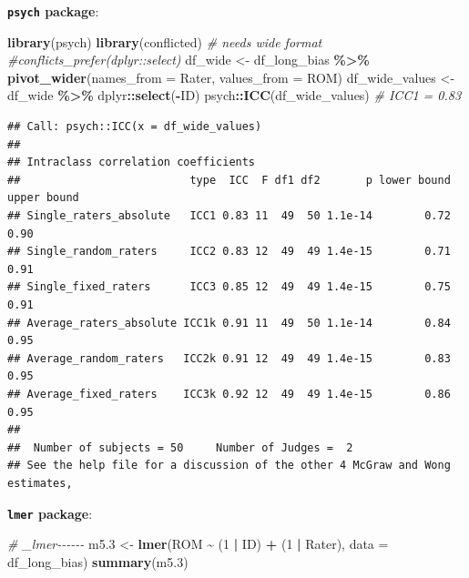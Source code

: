 \documentclass[
]{book}
\newenvironment{Shaded}{\begin{snugshade}}{\end{snugshade}}
\newcommand{\AttributeTok}[1]{\textcolor[rgb]{0.13,0.29,0.53}{#1}}
\newcommand{\CommentTok}[1]{\textcolor[rgb]{0.56,0.35,0.01}{\textit{#1}}}
\newcommand{\DecValTok}[1]{\textcolor[rgb]{0.00,0.00,0.81}{#1}}
\newcommand{\FloatTok}[1]{\textcolor[rgb]{0.00,0.00,0.81}{#1}}
\newcommand{\FunctionTok}[1]{\textcolor[rgb]{0.13,0.29,0.53}{\textbf{#1}}}
\newcommand{\NormalTok}[1]{#1}
\newcommand{\OtherTok}[1]{\textcolor[rgb]{0.56,0.35,0.01}{#1}}
\newcommand{\SpecialCharTok}[1]{\textcolor[rgb]{0.81,0.36,0.00}{\textbf{#1}}}
\begin{document}
\textbf{\texttt{psych} package}:

\begin{Shaded}
\begin{Highlighting}[]
\FunctionTok{library}\NormalTok{(psych)}
\FunctionTok{library}\NormalTok{(conflicted)}
\CommentTok{\# needs wide format}
\CommentTok{\#conflicts\_prefer(dplyr::select)}
\NormalTok{df\_wide }\OtherTok{\textless{}{-}}\NormalTok{ df\_long\_bias }\SpecialCharTok{\%\textgreater{}\%}
  \FunctionTok{pivot\_wider}\NormalTok{(}\AttributeTok{names\_from =}\NormalTok{ Rater, }\AttributeTok{values\_from =}\NormalTok{ ROM)}
\NormalTok{df\_wide\_values }\OtherTok{\textless{}{-}}\NormalTok{ df\_wide }\SpecialCharTok{\%\textgreater{}\%}\NormalTok{ dplyr}\SpecialCharTok{::}\FunctionTok{select}\NormalTok{(}\SpecialCharTok{{-}}\NormalTok{ID)}
\NormalTok{psych}\SpecialCharTok{::}\FunctionTok{ICC}\NormalTok{(df\_wide\_values) }\CommentTok{\# ICC1 = 0.83}
\end{Highlighting}
\end{Shaded}

\begin{verbatim}
## Call: psych::ICC(x = df_wide_values)
## 
## Intraclass correlation coefficients 
##                          type  ICC  F df1 df2       p lower bound upper bound
## Single_raters_absolute   ICC1 0.83 11  49  50 1.1e-14        0.72        0.90
## Single_random_raters     ICC2 0.83 12  49  49 1.4e-15        0.71        0.91
## Single_fixed_raters      ICC3 0.85 12  49  49 1.4e-15        0.75        0.91
## Average_raters_absolute ICC1k 0.91 11  49  50 1.1e-14        0.84        0.95
## Average_random_raters   ICC2k 0.91 12  49  49 1.4e-15        0.83        0.95
## Average_fixed_raters    ICC3k 0.92 12  49  49 1.4e-15        0.86        0.95
## 
##  Number of subjects = 50     Number of Judges =  2
## See the help file for a discussion of the other 4 McGraw and Wong estimates,
\end{verbatim}

\textbf{\texttt{lmer} package}:

\begin{Shaded}
\begin{Highlighting}[]
\CommentTok{\# \_lmer{-}{-}{-}{-}{-}{-}}
\NormalTok{m5}\FloatTok{.3} \OtherTok{\textless{}{-}} \FunctionTok{lmer}\NormalTok{(ROM }\SpecialCharTok{\textasciitilde{}}\NormalTok{ (}\DecValTok{1} \SpecialCharTok{|}\NormalTok{ ID) }\SpecialCharTok{+}\NormalTok{ (}\DecValTok{1} \SpecialCharTok{|}\NormalTok{ Rater), }\AttributeTok{data =}\NormalTok{ df\_long\_bias)}
\FunctionTok{summary}\NormalTok{(m5}\FloatTok{.3}\NormalTok{)}
\end{Highlighting}
\end{Shaded}
\end{document}
